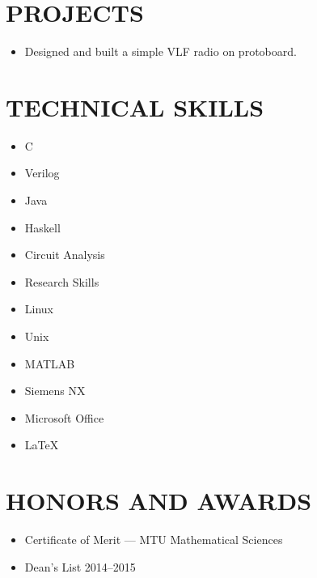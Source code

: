 \documentclass[letterpaper]{res}
\begin{document}
\begin{resume}
  \section{PROJECTS}
  \begin{itemize}
    \item Designed and built a simple VLF radio on protoboard.
  \end{itemize}

  \section{TECHNICAL SKILLS}
  \vspace{-1pt}
  \begin{multicols}{4}
    \begin{itemize} \itemsep1pt \parskip0pt 
      \item C
      \item Verilog
      \item Java
      \item Haskell
      \item Circuit Analysis
      \item Research Skills
      \item Linux
      \item Unix
      \item MATLAB
      \item Siemens NX
      \item Microsoft Office
      \item LaTeX
    \end{itemize}
  \end{multicols}

  \section{HONORS AND AWARDS}
  \begin{itemize}
    \item Certificate of Merit --- MTU Mathematical Sciences
    \item Dean's List 2014--2015
  \end{itemize}

\end{resume}
\end{document}
